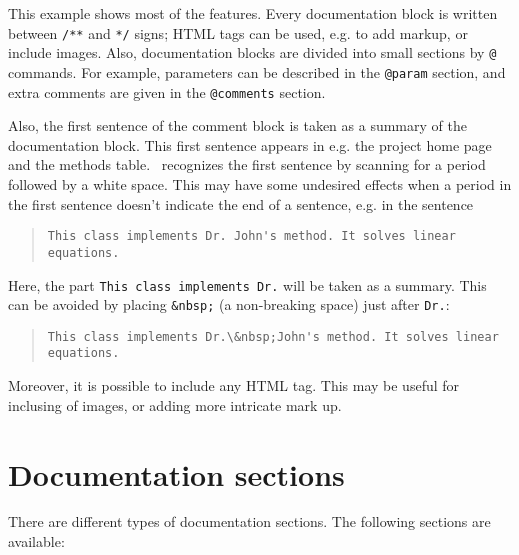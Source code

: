 This example shows most of the features. Every documentation block is written
between {\tt /**} and {\tt **/} signs; HTML tags can be used, e.g. to add
markup, or include images. Also, documentation blocks are divided into small
sections by {\tt @} commands. For example, parameters can be described in the {\tt @param}
section, and extra comments are given in the {\tt @comments} section. 

Also, the first sentence of the comment block is taken as a summary of the
documentation block.  This first sentence appears in e.g. the project home
page and the methods table.  \oxdoc~recognizes the first sentence by
scanning for a period followed by a white space.  This may have some undesired
effects when a period in the first sentence doesn't indicate the end of a
sentence, e.g. in the sentence 
\begin{quote}
\small\begin{verbatim}
This class implements Dr. John's method. It solves linear equations.
\end{verbatim}
\end{quote}
Here, the part {\tt This class implements Dr.} will be taken as a summary.
This can be avoided by placing {\tt \&nbsp;} (a non-breaking space)
just after {\tt Dr.}:
\begin{quote}
\small\begin{verbatim}
This class implements Dr.\&nbsp;John's method. It solves linear equations.
\end{verbatim}
\end{quote}

Moreover, it is possible to include any HTML tag. This may be useful for
inclusing of images, or adding more intricate mark up.

\section{Documentation sections}
There are different types of documentation sections.  
The following sections are available:

